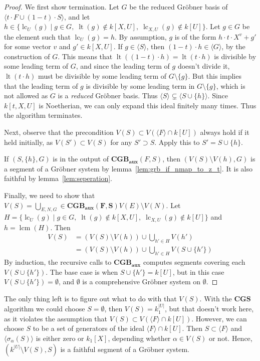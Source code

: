 \documentclass[a4paper, 12pt]{article}
\DeclareMathOperator{\LT}{lt}
\DeclareMathOperator{\LC}{lc}
\DeclareMathOperator{\lcm}{lcm}
\theoremstyle{changedot}
\theoremstyle{changedotbreak}
\theoremstyle{nonumberplain}
\newtheorem{proof}{Proof}
\begin{document}
\begin{proof}
  We first show termination. Let $G$ be the reduced Gröbner basis of $\langle t\cdot F \cup (1-t)\cdot S\rangle$, and let $h \in \{\LC_{U}(g) \mid g \in G,\; \LT(g) \notin k[X, U],\; \LC_{X, U}(g) \notin k[U]\}$. Let $g \in G$ be the element such that $\LC_{U}(g) = h$. By assumption, $g$ is of the form $h \cdot t \cdot X^{v} + g'$ for some vector $v$ and $g' \in k[X, U]$. If $g \in \langle S \rangle$, then $(1-t) \cdot h \in \langle G \rangle$, by the construction of $G$. This means that $\LT((1-t)\cdot h) = \LT(t \cdot h)$ is divisible by some leading term of $G$, and since the leading term of $g$ doesn't divide it, $\LT(t \cdot h)$ must be divisible by some leading term of $G \setminus \{g\}$. But this implies that the leading term of $g$ is divisible by some leading term in $G \setminus \{g\}$, which is not allowed as $G$ is a \textit{reduced} Gröbner basis. Thus $\langle S \rangle \subsetneq \langle S \cup \{h\} \rangle$. Since $k[t, X, U]$ is Noetherian, we can only expand this ideal finitely many times. Thus the algorithm terminates.

  Next, observe that the precondition $V(S) \subset V(\langle F \rangle \cap k[U])$ always hold if it held initially, as $V(S') \subset V(S)$ for any $S' \supset S$. Apply this to $S' = S \cup \{h\}$.

  If $(S, \{h\}, G)$ is in the output of $\mathbf{CGB_{aux}}(F, S)$, then $(V(S) \setminus V(h), G)$ is a segment of a Gröbner system by lemma~\ref{lem:grb_if_nmap_to_z_t}. It is also faithful by lemma~\ref{lem:seperation}.

  Finally, we need to show that $V(S) = \bigcup_{E, N, G} \in \mathbf{CGB_{aux}(F, S)} V(E) \setminus V(N)$. Let $H = \{\LC_{U}(g) \mid g \in G,\; \LT(g) \notin k[X, U],\; \LC_{X, U}(g) \notin k[U] \}$ and $h = \lcm(H)$. Then
  \begin{align*}
    V(S) &= (V(S) \setminus V(h)) \cup \bigcup_{h' \in H} V(h') \\
    &= (V(S) \setminus V(h)) \cup \bigcup_{h' \in H} V(S \cup \{h'\})
  \end{align*}
  By induction, the recursive calls to $\mathbf{CGB_{aux}}$ computes segments covering each $V(S \cup \{h'\})$. The base case is when $S \cup \{h'\} = k[U]$, but in this case $V(S \cup \{h'\}) = \emptyset$, and $\emptyset$ is a comprehensive Gröbner system on $\emptyset$.
\end{proof}

The only thing left is to figure out what to do with that $V(S)$. With the $\mathbf{CGS}$ algorithm we could choose $S = \emptyset$, then $V(S) = k_{1}^{|U|}$, but that doesn't work here, as it violates the assumption that $V(S) \subset V(\langle F \rangle \cap k[U])$. However, we can choose $S$ to be a set of generators of the ideal $\langle F \rangle \cap k[U]$. Then $S \subset \langle F \rangle$ and $\langle \sigma_{\alpha}(S) \rangle$ is either zero or $k_{1}[X]$, depending whether $\alpha \in V(S)$ or not. Hence, $(k^{|U|} \setminus V(S), S)$ is a faithful segment of a Gröbner system.
\end{document}
